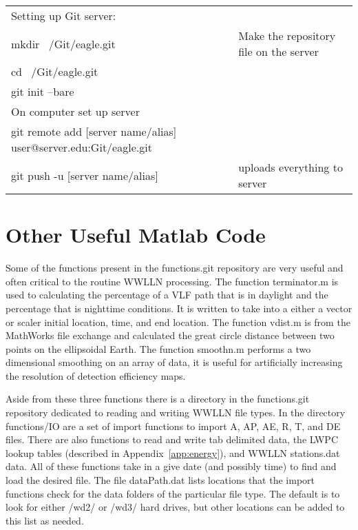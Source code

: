 \begin{table}[h!]
\begin{center}
\begin{tabular}{|p{3in}|p{3in}|}
Setting up Git server: & \\
mkdir ~/Git/eagle.git & Make the repository file on the server \\
cd ~/Git/eagle.git & \\
git init --bare & \\

On computer set up server & \\
git remote add [server name/alias] user@server.edu:Git/eagle.git & \\
git push -u [server name/alias] & uploads everything to server \\

\hline
\end{tabular}
\end{center}
\label{label}
\end{table}

\section{Other Useful Matlab Code}

Some of the functions present in the functions.git repository are very useful and often critical to the routine WWLLN processing.
The function terminator.m is used to calculating the percentage of a VLF path that is in daylight and the percentage that is nighttime conditions.
It is written to take into a either a vector or scaler initial location, time, and end location.
The function vdist.m is from the MathWorks file exchange and calculated the great circle distance between two points on the ellipsoidal Earth.
The function smoothn.m performs a two dimensional smoothing on an array of data, it is useful for artificially increasing the resolution of detection efficiency maps.

Aside from these three functions there is a directory in the functions.git repository dedicated to reading and writing WWLLN file types.
In the directory functions/IO are a set of import functions to import A, AP, AE, R, T, and DE files.
There are also functions to read and write tab delimited data, the LWPC lookup tables (described in Appendix~\ref{app:energy}), and WWLLN stations.dat data.
All of these functions take in a give date (and possibly time) to find and load the desired file.
The file dataPath.dat lists locations that the import functions check for the data folders of the particular file type.
The default is to look for either /wd2/ or /wd3/ hard drives, but other locations can be added to this list as needed.

